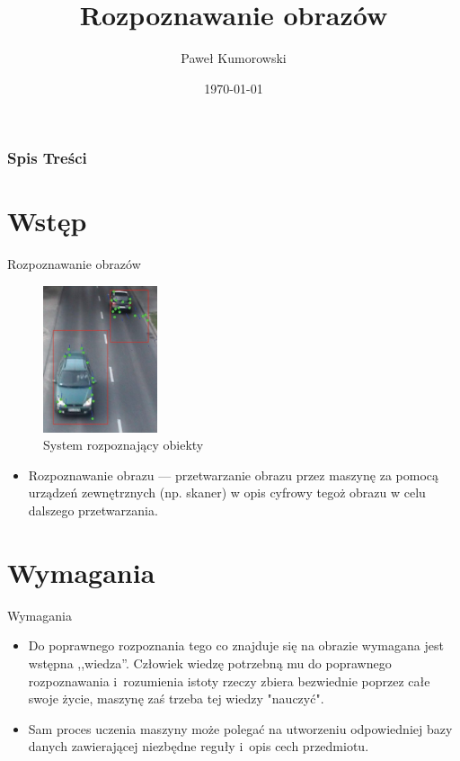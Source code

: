 \documentclass{beamer}
\title{Rozpoznawanie obrazów}
\author{Paweł Kumorowski}
\date{\today}
\begin{document}
\frame{\titlepage}


\begin{frame}
\frametitle{Spis Treści}
\tableofcontents
\end{frame}


\section{Wstęp}
\begin{frame}{Rozpoznawanie obrazów}

\begin{figure}
	\centering
		\includegraphics[width=0.3\textwidth]{samochod.jpg}
		\caption{System rozpoznający obiekty}
\end{figure}

\begin{itemize}
\item Rozpoznawanie obrazu --- przetwarzanie obrazu przez maszynę za pomocą urządzeń zewnętrznych (np. skaner) w opis cyfrowy tegoż obrazu w celu dalszego przetwarzania.
\end{itemize}
\end{frame}


\section{Wymagania}
\begin{frame}{Wymagania}
\begin{itemize}
\item Do poprawnego rozpoznania tego co znajduje się na obrazie wymagana jest wstępna ,,wiedza''. Człowiek wiedzę potrzebną mu do poprawnego rozpoznawania i~rozumienia istoty rzeczy zbiera bezwiednie poprzez całe swoje życie, maszynę zaś trzeba tej wiedzy "nauczyć".
\pause
\item Sam proces uczenia maszyny może polegać na utworzeniu odpowiedniej bazy danych zawierającej niezbędne reguły i~opis cech przedmiotu.
\end{itemize}
\end{frame}
\end{document}
